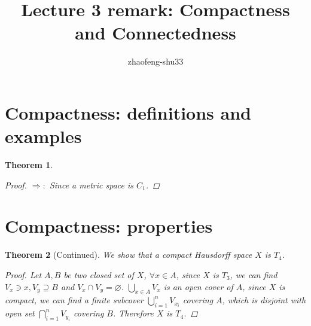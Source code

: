 \documentclass{article}
\def\emptyset{\varnothing}
\newtheorem{definition}{Definition}[section]
\newtheorem{theorem}{Theorem}[section]
\begin{document}
% 
\title{Lecture 3 remark: Compactness and Connectedness}
\author{zhaofeng-shu33}
\maketitle
\section{Compactness: definitions and examples}

\setcounter{theorem}{5}
\begin{theorem}
\begin{proof}\mbox{}

$\Rightarrow:$ Since a metric space is $C_1$.
\end{proof}
\end{theorem}
\section{Compactness: properties}
\setcounter{theorem}{9}
\begin{theorem}[Continued]
We show that a compact Hausdorff space $X$ is $T_4$.
\begin{proof}
Let $A,B$ be two closed set of $X$,
$\forall x\in A$, since $X$ is $T_3$, we can find $V_x \ni x, V_y\supseteq B$ and $V_x\cap V_y=\emptyset$. $\displaystyle\bigcup_{x\in A}V_x$ is an open cover of $A$, since $X$ is compact, we can find a finite subcover $\bigcup_{i=1}^n V_{x_i}$ covering $A$, which is disjoint with open set $\bigcap_{i=1}^n V_{y_i}$ covering $B$. Therefore $X$ is $T_4$.
\end{proof}
\end{theorem}
\end{document}
